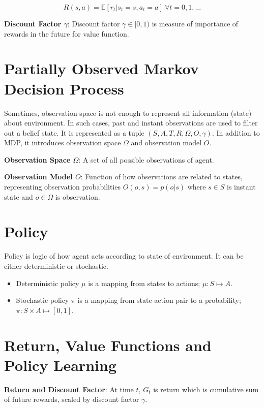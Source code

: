 \begin{equation}
R(s,a) = \mathbb{E}[r_t|s_t=s, a_t=a] \: \forall t = 0,1, ...
\end{equation}

\textbf{Discount Factor $\gamma$}: Discount factor $\gamma \in [0,1)$ is measure of importance of rewards in the future for value function.



\section{Partially Observed Markov Decision Process}
\label{sec:pomdp}

Sometimes, observation space is not enough to represent all information (state) about environment. In such cases, past and instant observations are used to filter out a belief state. It is represented as a tuple $(S,A,T,R,\Omega,O,\gamma)$. In addition to MDP, it introduces observation space $\Omega$ and observation model $O$.

\textbf{Observation Space $\Omega$}: A set of all possible observations of agent.

\textbf{Observation Model $O$}: Function of how observations are related to states, representing observation probabilities $O(o,s) = p(o|s)$ where $s \in S$ is instant state and $o \in \Omega$ is observation. 

\section{Policy}

Policy is logic of how agent acts according to state of environment. It can be either deterministic or stochastic. 

\begin{itemize}
	\item Deterministic policy $\mu$ is a mapping from states to actions; $\mu \colon S \mapsto A$.
	\item Stochastic policy $\pi$ is a mapping from state-action pair to a probability; $\pi \colon S \times A \mapsto [0,1]$.
\end{itemize}

\section{Return, Value Functions and Policy Learning}

\textbf{Return and Discount Factor}: At time $t$, $G_t$ is return which is cumulative sum of future rewards, scaled by discount factor $\gamma$.

